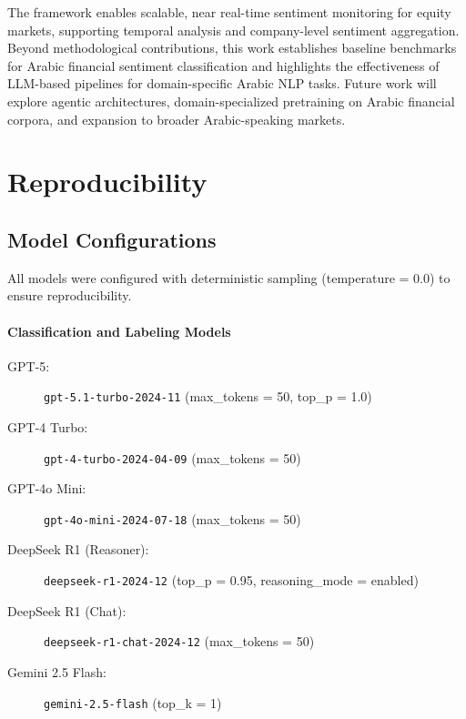 \documentclass[10pt,a4paper]{article}
\begin{document}
The framework enables scalable, near real-time sentiment monitoring for equity markets, supporting temporal analysis and company-level sentiment aggregation. Beyond methodological contributions, this work establishes baseline benchmarks for Arabic financial sentiment classification and highlights the effectiveness of LLM-based pipelines for domain-specific Arabic NLP tasks. Future work will explore agentic architectures, domain-specialized pretraining on Arabic financial corpora, and expansion to broader Arabic-speaking markets.







\appendix

\section{Reproducibility}
\label{sec:appendix}

\subsection{Model Configurations}

All models were configured with deterministic sampling (temperature = 0.0) to ensure reproducibility.

\paragraph{Classification and Labeling Models}
\begin{description}
    \item[GPT-5:] \texttt{gpt-5.1-turbo-2024-11} (max\_tokens = 50, top\_p = 1.0)
    \item[GPT-4 Turbo:] \texttt{gpt-4-turbo-2024-04-09} (max\_tokens = 50)
    \item[GPT-4o Mini:] \texttt{gpt-4o-mini-2024-07-18} (max\_tokens = 50)
    \item[DeepSeek R1 (Reasoner):] \texttt{deepseek-r1-2024-12}
    (top\_p = 0.95, reasoning\_mode = enabled)
    \item[DeepSeek R1 (Chat):] \texttt{deepseek-r1-chat-2024-12} (max\_tokens = 50)
    \item[Gemini 2.5 Flash:] \texttt{gemini-2.5-flash} (top\_k = 1)
\end{description}
\end{document}
